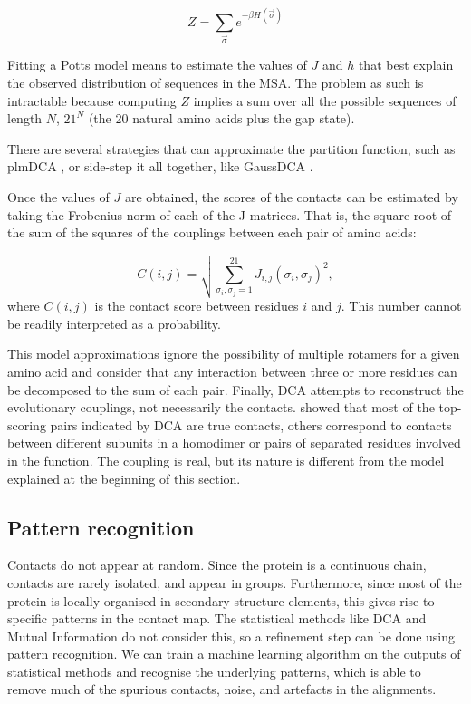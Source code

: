 \begin{equation*}
Z = \sum_{\vec{\sigma}} e^{-\beta H\left(\vec{\sigma}\right)}
\end{equation*}

Fitting a Potts model means to estimate the values of $J$ and $h$ that best explain the observed distribution of sequences in the MSA.
The problem as such is intractable because computing $Z$ implies a sum over all the possible sequences of length $N$, $21^N$ (the 20 natural amino acids plus the gap state).

There are several strategies that can approximate the partition function, such as plmDCA \citep{plmDCA}, or side-step it all together, like GaussDCA \citep{GaussDCA}.

Once the values of $J$ are obtained, the scores of the contacts can be estimated by taking the Frobenius norm of each of the J matrices.
That is, the square root of the sum of the squares of the couplings between each pair of amino acids:

\begin{equation*}
C(i, j) = \sqrt{\sum_{\sigma_i, \sigma_j=1}^{21} J_{i, j}(\sigma_i, \sigma_j)^2},
\end{equation*}
where $C(i, j)$ is the contact score between residues $i$ and $j$.
This number cannot be readily interpreted as a probability.

This model approximations ignore the possibility of multiple rotamers for a given amino acid 
and consider that any interaction between three or more residues can be decomposed to the sum of each pair.
Finally, DCA attempts to reconstruct the evolutionary couplings, not necessarily the contacts.
\citet{contact_errors} showed that most of the top-scoring pairs indicated by DCA are true contacts, others correspond to contacts between different subunits in a homodimer or pairs of separated residues involved in the function.
The coupling is real, but its nature is different from the model explained at the beginning of this section.

\subsection{Pattern recognition}
Contacts do not appear at random.
Since the protein is a continuous chain, contacts are rarely isolated, and appear in groups.
Furthermore, since most of the protein is locally organised in secondary structure elements, this gives rise to specific patterns in the contact map.
The statistical methods like DCA and Mutual Information do not consider this, so a refinement step can be done using pattern recognition.
We can train a machine learning algorithm on the outputs of statistical methods and recognise the underlying patterns, which is able to remove much of the spurious contacts, noise, and artefacts in the alignments.

